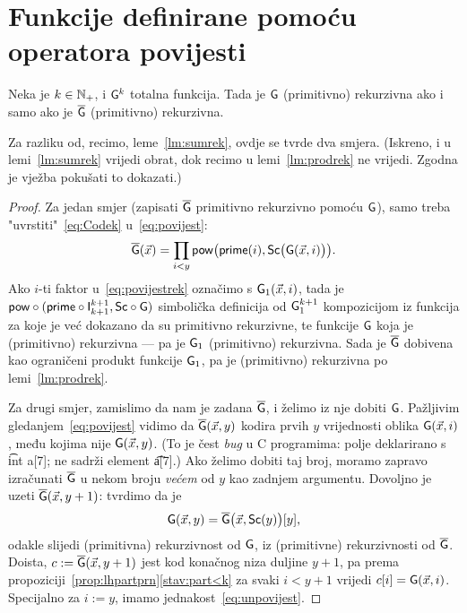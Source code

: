 \section{Funkcije definirane pomoću operatora povijesti}

\begin{lema}\label{lm:povijestrek}
Neka je $k\in{\mathbb N}_+$, i $\mathsf{G}^k$ totalna funkcija. Tada je ${\mathsf G}$ (primitivno) rekurzivna ako i samo ako je $\overline{\mathsf G}$ (primitivno) rekurzivna.
\end{lema}

Za razliku od, recimo, leme~\ref{lm:sumrek}, ovdje se tvrde dva smjera. (Iskreno, i u lemi~\ref{lm:sumrek} vrijedi obrat, dok recimo u lemi~\ref{lm:prodrek} ne vrijedi. Zgodna je vježba pokušati to dokazati.)
\begin{proof}
Za jedan smjer (zapisati $\overline{\mathsf G}$ primitivno rekurzivno pomoću $\mathsf G$), samo treba "uvrstiti"~\eqref{eq:Codek} u~\eqref{eq:povijest}:
\begin{equation}\label{eq:povijestrek}
    \overline{\mathsf G}(\vec x)=\prod_{i<y}\mathsf{pow}\bigl(\mathsf{prime}(i),\mathsf{Sc}\bigl(\mathsf{G}(\vec x,i)\bigr)\bigr)\text.
\end{equation}
Ako $i$-ti faktor u~\eqref{eq:povijestrek} označimo s $\mathsf G_1(\vec x,i)$, tada je $\mathsf{pow}\circ(\mathsf{prime}\circ\mathsf I_{k+1}^{k+1},\mathsf{Sc}\circ\mathsf G)$ simbolička definicija od $\mathsf G_1^{k+1}$ kompozicijom iz funkcija za koje je već dokazano da su primitivno rekurzivne, te funkcije $\mathsf G$ koja je (primitivno) rekurzivna --- pa je $\mathsf G_1$ (primitivno) rekurzivna. Sada je $\overline{\mathsf G}$ dobivena kao ograničeni produkt funkcije $\mathsf G_1$, pa je (primitivno) rekurzivna po lemi~\ref{lm:prodrek}.

Za drugi smjer, zamislimo da nam je zadana $\overline{\mathsf G}$, i želimo iz nje dobiti $\mathsf G$. Pažljivim gledanjem~\eqref{eq:povijest} vidimo da $\overline{\mathsf G}(\vec x,y)$ kodira prvih $y$ vrijednosti oblika $\mathsf G(\vec x,i)$, među kojima nije $\mathsf G(\vec x,y)$. (To je čest \emph{bug} u C programima: polje deklarirano s \t{int a[7];} ne sadrži element \t{a[7]}.) Ako želimo dobiti taj broj, moramo zapravo izračunati $\overline{\mathsf G}$ u nekom broju \emph{većem} od $y$ kao zadnjem argumentu. Dovoljno je uzeti $\overline{\mathsf G}(\vec x,y+1)$: tvrdimo da je
\begin{equation}\label{eq:unpovijest}
    \mathsf G(\vec x,y)=\overline{\mathsf G}\bigl(\vec x,\mathsf{Sc}(y)\bigr)[y]\text,
\end{equation}
odakle slijedi (primitivna) rekurzivnost od $\mathsf G$, iz (primitivne) rekurzivnosti od $\overline{\mathsf G}$. Doista, $c:=\overline{\mathsf G}(\vec x,y+1)$ jest kod konačnog niza duljine $y+1$, pa prema propoziciji~\ref{prop:lhpartprn}\eqref{stav:part<k} za svaki $i<y+1$ vrijedi $c[i]=\mathsf G(\vec x,i)$. Specijalno za $i:=y$, imamo jednakost~\eqref{eq:unpovijest}.
\end{proof}

